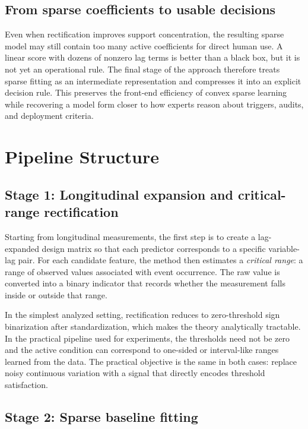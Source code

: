 \subsection{From sparse coefficients to usable decisions}

Even when rectification improves support concentration, the resulting sparse model may still contain too many active coefficients for direct human use. A linear score with dozens of nonzero lag terms is better than a black box, but it is not yet an operational rule. The final stage of the approach therefore treats sparse fitting as an intermediate representation and compresses it into an explicit decision rule. This preserves the front-end efficiency of convex sparse learning while recovering a model form closer to how experts reason about triggers, audits, and deployment criteria.

\section{Pipeline Structure}

\subsection{Stage 1: Longitudinal expansion and critical-range rectification}

Starting from longitudinal measurements, the first step is to create a lag-expanded design matrix so that each predictor corresponds to a specific variable-lag pair. For each candidate feature, the method then estimates a \emph{critical range}: a range of observed values associated with event occurrence. The raw value is converted into a binary indicator that records whether the measurement falls inside or outside that range.

In the simplest analyzed setting, rectification reduces to zero-threshold sign binarization after standardization, which makes the theory analytically tractable. In the practical pipeline used for experiments, the thresholds need not be zero and the active condition can correspond to one-sided or interval-like ranges learned from the data. The practical objective is the same in both cases: replace noisy continuous variation with a signal that directly encodes threshold satisfaction.

\subsection{Stage 2: Sparse baseline fitting}

